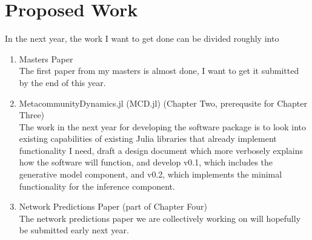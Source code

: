 \documentclass[]{article}
\begin{document}
\section{Proposed Work}
In the next year, the work I want to get done can be divided roughly into 
\begin{enumerate}
    \item Masters Paper \hfill \\
    The first paper from my masters is almost done, I want to get it submitted by the end of this year.

    \item MetacommunityDynamics.jl (MCD.jl) (Chapter Two, prerequsite for Chapter Three) \hfill \\
    The work in the next year for developing the software package is to look into existing capabilities of existing Julia libraries that already implement functionality I need, draft a design document which more verbosely explains how the software will function, and develop v0.1, which includes the generative model component, and v0.2, which implements the minimal functionality for the inference component.

    \item Network Predictions Paper (part of Chapter Four) \hfill \\ 
    The network predictions paper we are collectively working on will hopefully be submitted early next year.
    
\end{enumerate}
\end{document}
